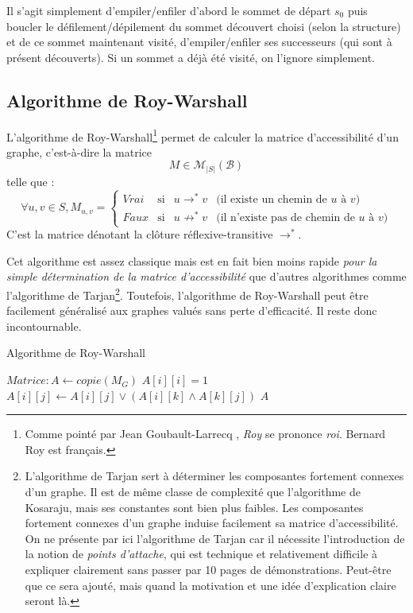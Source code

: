 \documentclass[../../../main.tex]{subfiles}
\begin{document}
Il s'agit simplement d'empiler/enfiler d'abord le sommet de départ $s_0$ puis boucler le défilement/dépilement du sommet découvert choisi (selon la structure) et de ce sommet maintenant visité, d'empiler/enfiler ses successeurs (qui sont à présent découverts). Si un sommet a déjà été visité, on l'ignore simplement.
\subsection{Algorithme de Roy-Warshall}
L'algorithme de Roy-Warshall\footnote{Comme pointé par Jean Goubault-Larrecq \cite{ENSGraphes}, \textit{Roy} se prononce \textit{roi}. Bernard Roy est français.} permet de calculer la matrice d'accessibilité d'un graphe, c'est-à-dire la matrice $$M\in\mathcal{M}_{|S|}(\mathcal{B})$$ telle que :
$$\forall u, v\in S, M_{u, v} = \left\{
\begin{array}{lcll}
\textit{Vrai} & \text{si} & u\rightarrow^* v & \text{(il existe un chemin de $u$ à $v$)} \\
\textit{Faux} & \text{si} & u\not\rightarrow^*v & \text{(il n'existe pas de chemin de $u$ à $v$)}
\end{array}\right.
$$
C'est la matrice dénotant la clôture réflexive-transitive $\rightarrow^*$.

Cet algorithme est assez classique mais est en fait bien moins rapide \textit{pour la simple détermination de la matrice d'accessibilité} que d'autres algorithmes comme l'algorithme de Tarjan\footnote{L'algorithme de Tarjan sert à déterminer les composantes fortement connexes d'un graphe. Il est de même classe de complexité que l'algorithme de Kosaraju, mais ses constantes sont bien plus faibles. Les composantes fortement connexes d'un graphe induise facilement sa matrice d'accessibilité. On ne présente par ici l'algorithme de Tarjan car il nécessite l'introduction de la notion de \textit{points d'attache}, qui est technique et relativement difficile à expliquer clairement sans passer par 10 pages de démonstrations. Peut-être que ce sera ajouté, mais quand la motivation et une idée d'explication claire seront là.}. Toutefois, l'algorithme de Roy-Warshall peut être facilement généralisé aux graphes valués sans perte d'efficacité. Il reste donc incontournable.

\begin{algorithm}
\caption{Algorithme de Roy-Warshall}\label{alg:roy_warshall}
$Matrice:A\leftarrow copie(M_G)$\;
 {
	$A[i][i] = 1$
}
 {
	 {
		 {
			$A[i][j]\leftarrow A[i][j]\vee (A[i][k] \wedge A[k][j])$\;
		}
	}
}
\Return $A$\;
\end{algorithm}
\end{document}
